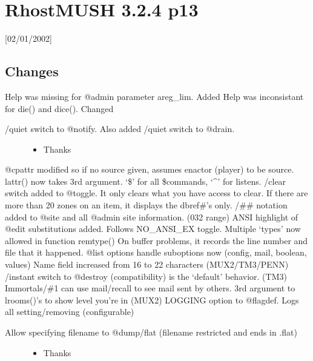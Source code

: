 \documentclass[letterpaper,10pt,english]{sphinxmanual}
\begin{document}
\section{RhostMUSH 3.2.4 p13}
\label{\detokenize{changelog:rhostmush-3-2-4-p13}}\label{\detokenize{changelog:changelog-3-2-4p13}}
\sphinxAtStartPar
{[}02/01/2002{]}


\subsection{Changes}
\label{\detokenize{changelog:id26}}
\sphinxAtStartPar
Help was missing for @admin parameter areg\_lim.  \sphinxhyphen{} Added
Help was inconsistant for die() and dice().  \sphinxhyphen{} Changed
\begin{description}
\item[{/quiet switch to @notify.  Also added /quiet switch to @drain.}] \leavevmode\begin{itemize}
\item {} 
\sphinxAtStartPar
Thanks 

\end{itemize}

\end{description}

\sphinxAtStartPar
@cpattr modified so if no source given, assumes enactor (player) to be source.
lattr() now takes 3rd argument. ‘\$’ for all \$commands, ‘\textasciicircum{}’ for listens.
/clear switch added to @toggle.  It only clears what you have access to clear.
If there are more than 20 zones on an item, it displays the dbref\#’s only.
/\#\# notation added to @site and all @admin site information. (0\sphinxhyphen{}32 range)
ANSI highlight of @edit substitutions added.  Follows NO\_ANSI\_EX toggle.
Multiple ‘types’ now allowed in function remtype()
On buffer problems, it records the line number and file that it happened.
@list options handle sub\sphinxhyphen{}options now (config, mail, boolean, values)
Name field increased from 16 to 22 characters (MUX2/TM3/PENN)
/instant switch to @destroy (compatibility) \sphinxhyphen{} is the ‘default’ behavior. (TM3)
Immortals/\#1 can use mail/recall to see mail sent by others.
3rd argument to lrooms()’s to show level you’re in (MUX2)
LOGGING option to @flagdef.  Logs all setting/removing (configurable)
\begin{description}
\item[{Allow specifying filename to @dump/flat (filename restricted and ends in .flat)}] \leavevmode\begin{itemize}
\item {} 
\sphinxAtStartPar
Thanks 

\end{itemize}

\end{description}
\end{document}
